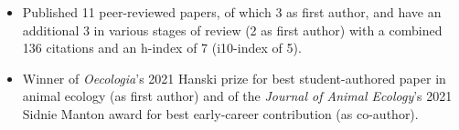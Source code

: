 


\begin{itemize}
  \item Published 11 peer-reviewed papers, of which 3 as first author, and have an additional 3 in various stages of review (2 as first author) with a combined 136 citations and an h-index of 7 (i10-index of 5).
  \item Winner of \textit{Oecologia}'s 2021 Hanski prize for best student-authored paper in animal ecology (as first author) and of the \textit{Journal of Animal Ecology}'s 2021 Sidnie Manton award for best early-career contribution (as co-author).
\end{itemize}